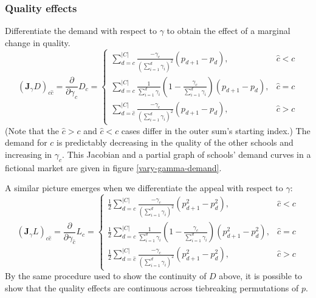 \documentclass[12pt]{article}
\theoremstyle{definition}
\begin{document}
\subsubsection{Quality effects} \label{unconstrainedqualityeffects}
Differentiate the demand with respect to $\gamma$ to obtain the effect of a marginal change in quality.
\begin{equation} \label{jac-gamma-demand-uncons}
\left(\mathbf{J}_\gamma D \right)_{c\hat c} =
\frac{\partial}{\partial\gamma_{\hat c}} D_c = \begin{cases}
\sum_{d=c}^{|C|} \frac{-\gamma_c}{\left(\sum_{i=1}^{d} \gamma_i \right)^2} \left(p_{d+1} - p_d \right), & \hat c < c \\
\sum_{d=c}^{|C|} \frac{1}{\sum_{i=1}^{d} \gamma_i}
    \left( 1 - \frac{\gamma_c}{\sum_{i=1}^{d}\gamma_i }\right)
    \left(p_{d+1} - p_d \right), & \hat c = c\\
\sum_{d=\hat c}^{|C|} \frac{-\gamma_c}{\left(\sum_{i=1}^{d}\gamma_i \right)^2} \left(p_{d+1} - p_d \right), & \hat c > c
\end{cases}
\end{equation}
(Note that the $\hat c > c$ and $ \hat c < c$ cases differ in the outer sum's starting index.) The demand for $c$ is predictably decreasing in the quality of the other schools and increasing in $\gamma_c$. This Jacobian and a partial graph of schools’ demand curves in a fictional market are given in figure \ref{vary-gamma-demand}. 

A similar picture emerges when we differentiate the appeal with respect to $\gamma$:
\begin{equation}
\left(\mathbf{J}_\gamma L \right)_{c\hat c} =
\frac{\partial}{\partial\gamma_{\hat c}} L_c = \begin{cases}
\frac{1}{2}\sum_{d=c}^{|C|} \frac{-\gamma_c}{\left(\sum_{i=1}^{d}\gamma_i \right)^2} \left(p_{d+1}^2 - p_d^2 \right), & \hat c < c \\
\frac{1}{2}\sum_{d=c}^{|C|} \frac{1}{\sum_{i=1}^{d} \gamma_i}
    \left( 1 - \frac{\gamma_c}{\sum_{i=1}^{d} \gamma_i}\right)
    \left(p_{d+1}^2 - p_d^2 \right), & \hat c = c\\
\frac{1}{2}\sum_{d=\hat c}^{|C|} \frac{-\gamma_c}{\left(\sum_{i=1}^{d} \gamma_i \right)^2} \left(p_{d+1}^2 - p_d^2 \right), & \hat c > c
\end{cases}\end{equation}
By the same procedure used to show the continuity of $D$ above, it is possible to show that the quality effects are continuous across tiebreaking permutations of $p$.
\end{document}
